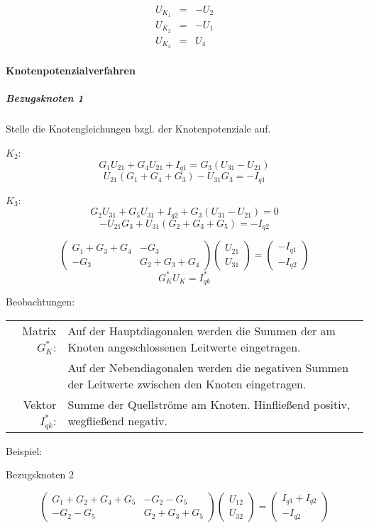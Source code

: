 \documentclass[german]{article}
\begin{document}
\begin{eqnarray*}
	U_{K_1} & = & -U_2 \\
	U_{K_2} & = & -U_1 \\
	U_{K_3} & = & U_4
\end{eqnarray*}

\paragraph{Knotenpotenzialverfahren}

\subparagraph{Bezugsknoten 1}

Stelle die Knotengleichungen bzgl. der Knotenpotenziale auf.

$K_2$:
\[
	G_1 U_{21} + G_4 U_{21} + I_{q1} = G_3 (U_{31} - U_{21})
\]
\[
	U_{21} ( G_1 + G_4 + G_3 ) - U_{31} G_3 = - I_{q1}
\]

$K_3$:
\[
	G_2 U_{31} + G_5 U_{31} + I_{q2} + G_3 (U_{31} - U_{21}) = 0
\]
\[
	-U_{21} G_3 + U_{31} ( G_2 + G_3 + G_5 ) = -I_{q2}
\]

\[
	\begin{pmatrix}
		G_1 + G_3 + G_4 & - G_3 \\
		- G_3 & G_2 + G_3 + G_4
	\end{pmatrix}
	\begin{pmatrix}
		U_{21} \\
		U_{31}
	\end{pmatrix}
	=
	\begin{pmatrix}
		- I_{q1} \\
		- I_{q2}
	\end{pmatrix}
\]
\[
	G_K^* U_K = I_{qk}^*
\]

Beobachtungen:
\begin{tabular}{rl}
	Matrix $G_K^*$: & Auf der Hauptdiagonalen werden die Summen der am Knoten angeschlossenen Leitwerte eingetragen. \\
	 & Auf der Nebendiagonalen werden die negativen Summen der Leitwerte zwischen den Knoten eingetragen. \\
	Vektor $I_{qk}^*$: & Summe der Quellströme am Knoten. Hinfließend positiv, wegfließend negativ.
\end{tabular}

Beispiel:

Bezugsknoten 2

\[
	\begin{pmatrix}
		G_1 + G_2 + G_4 + G_5 & -G_2 - G_5 \\
		-G_2 - G_5 & G_2 + G_3 + G_5
	\end{pmatrix}
	\begin{pmatrix}
		U_{12} \\
		U_{32}
	\end{pmatrix}
	=
	\begin{pmatrix}
		I_{q1} + I_{q2} \\
		- I_{q2}
	\end{pmatrix}
\]
\end{document}
